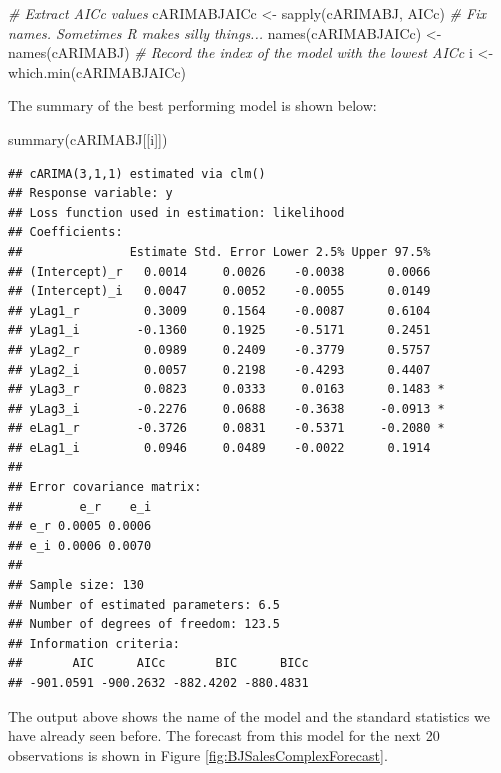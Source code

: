 \documentclass[
]{book}
\newenvironment{Shaded}{\begin{snugshade}}{\end{snugshade}}
\newcommand{\CommentTok}[1]{\textcolor[rgb]{0.56,0.35,0.01}{\textit{#1}}}
\newcommand{\FunctionTok}[1]{\textcolor[rgb]{0.00,0.00,0.00}{#1}}
\newcommand{\NormalTok}[1]{#1}
\newcommand{\OtherTok}[1]{\textcolor[rgb]{0.56,0.35,0.01}{#1}}
\begin{document}
\begin{Shaded}
\begin{Highlighting}[]
\CommentTok{\# Extract AICc values}
\NormalTok{cARIMABJAICc }\OtherTok{\textless{}{-}} \FunctionTok{sapply}\NormalTok{(cARIMABJ, AICc)}
\CommentTok{\# Fix names. Sometimes R makes silly things...}
\FunctionTok{names}\NormalTok{(cARIMABJAICc) }\OtherTok{\textless{}{-}} \FunctionTok{names}\NormalTok{(cARIMABJ)}
\CommentTok{\# Record the index of the model with the lowest AICc}
\NormalTok{i }\OtherTok{\textless{}{-}} \FunctionTok{which.min}\NormalTok{(cARIMABJAICc)}
\end{Highlighting}
\end{Shaded}

The summary of the best performing model is shown below:

\begin{Shaded}
\begin{Highlighting}[]
\FunctionTok{summary}\NormalTok{(cARIMABJ[[i]])}
\end{Highlighting}
\end{Shaded}

\begin{verbatim}
## cARIMA(3,1,1) estimated via clm()
## Response variable: y
## Loss function used in estimation: likelihood
## Coefficients:
##               Estimate Std. Error Lower 2.5% Upper 97.5%  
## (Intercept)_r   0.0014     0.0026    -0.0038      0.0066  
## (Intercept)_i   0.0047     0.0052    -0.0055      0.0149  
## yLag1_r         0.3009     0.1564    -0.0087      0.6104  
## yLag1_i        -0.1360     0.1925    -0.5171      0.2451  
## yLag2_r         0.0989     0.2409    -0.3779      0.5757  
## yLag2_i         0.0057     0.2198    -0.4293      0.4407  
## yLag3_r         0.0823     0.0333     0.0163      0.1483 *
## yLag3_i        -0.2276     0.0688    -0.3638     -0.0913 *
## eLag1_r        -0.3726     0.0831    -0.5371     -0.2080 *
## eLag1_i         0.0946     0.0489    -0.0022      0.1914  
## 
## Error covariance matrix:
##        e_r    e_i
## e_r 0.0005 0.0006
## e_i 0.0006 0.0070
## 
## Sample size: 130
## Number of estimated parameters: 6.5
## Number of degrees of freedom: 123.5
## Information criteria:
##       AIC      AICc       BIC      BICc 
## -901.0591 -900.2632 -882.4202 -880.4831
\end{verbatim}

The output above shows the name of the model and the standard statistics we have already seen before. The forecast from this model for the next 20 observations is shown in Figure \ref{fig:BJSalesComplexForecast}.
\end{document}
